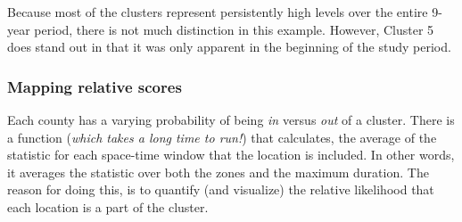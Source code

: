 \documentclass[
]{book}
\newenvironment{Shaded}{\begin{snugshade}}{\end{snugshade}}
\newcommand{\AttributeTok}[1]{\textcolor[rgb]{0.13,0.29,0.53}{#1}}
\newcommand{\CommentTok}[1]{\textcolor[rgb]{0.56,0.35,0.01}{\textit{#1}}}
\newcommand{\DecValTok}[1]{\textcolor[rgb]{0.00,0.00,0.81}{#1}}
\newcommand{\DocumentationTok}[1]{\textcolor[rgb]{0.56,0.35,0.01}{\textbf{\textit{#1}}}}
\newcommand{\FunctionTok}[1]{\textcolor[rgb]{0.13,0.29,0.53}{\textbf{#1}}}
\newcommand{\NormalTok}[1]{#1}
\newcommand{\OtherTok}[1]{\textcolor[rgb]{0.56,0.35,0.01}{#1}}
\newcommand{\SpecialCharTok}[1]{\textcolor[rgb]{0.81,0.36,0.00}{\textbf{#1}}}
\newcommand{\StringTok}[1]{\textcolor[rgb]{0.31,0.60,0.02}{#1}}
\begin{document}
\begin{Shaded}
\end{Shaded}

Because most of the clusters represent persistently high levels over the entire 9-year period, there is not much distinction in this example. However, Cluster 5 does stand out in that it was only apparent in the beginning of the study period.

\hypertarget{mapping-relative-scores}{%
\subsubsection{Mapping relative scores}\label{mapping-relative-scores}}

Each county has a varying probability of being \emph{in} versus \emph{out} of a cluster. There is a function (\emph{which takes a long time to run!}) that calculates, the average of the statistic for each space-time window that the location is included. In other words, it averages the statistic over both the zones and the maximum duration. The reason for doing this, is to quantify (and visualize) the relative likelihood that each location is a part of the cluster.
\end{document}
